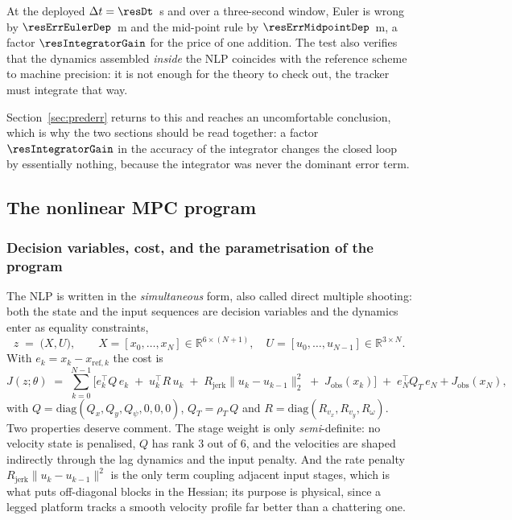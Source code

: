 \documentclass[11pt,a4paper]{article}
\newcommand{\R}{\mathbb{R}}
\newcommand{\Jobs}{J_{\mathrm{obs}}}
\newcommand{\Rjerk}{R_{\mathrm{jerk}}}
\begin{document}

At the deployed $\Delta t=\resDt$~s and over a three-second window, Euler is wrong by
$\resErrEulerDep$~m and the mid-point rule by $\resErrMidpointDep$~m, a factor $\resIntegratorGain$ for the
price of one addition. The test also verifies that the dynamics assembled \emph{inside} the NLP coincides
with the reference scheme to machine precision: it is not enough for the theory to check out, the tracker
must integrate that way.

Section~\ref{sec:prederr} returns to this and reaches an uncomfortable conclusion, which is why the two
sections should be read together: a factor $\resIntegratorGain$ in the accuracy of the integrator changes the
closed loop by essentially nothing, because the integrator was never the dominant error term.

\subsection{The nonlinear MPC program}
\label{sec:nlp}

\subsubsection{Decision variables, cost, and the parametrisation of the program}
\label{sec:shoot}

The NLP is written in the \emph{simultaneous} form, also called direct multiple shooting: both the state and
the input sequences are decision variables and the dynamics enter as equality constraints,
\begin{equation}
  z \;=\; \big(X,U\big),\qquad X=[x_0,\dots,x_N]\in\R^{6\times(N+1)},\quad U=[u_0,\dots,u_{N-1}]\in\R^{3\times N}.
\end{equation}
With $e_k=x_k-x_{\mathrm{ref},k}$ the cost is
\begin{equation}
  J(z;\theta) \;=\;
  \sum_{k=0}^{N-1}\Big[e_k^{\!\top} Q\, e_k
  \;+\; u_k^{\!\top} R\, u_k
  \;+\; \Rjerk\|u_k-u_{k-1}\|_2^2
  \;+\; \Jobs(x_k)\Big]
  \;+\;e_N^{\!\top} Q_T\, e_N + \Jobs(x_N),
  \label{eq:cost}
\end{equation}
with $Q=\mathrm{diag}(Q_x,Q_y,Q_\psi,0,0,0)$, $Q_T=\rho_T\,Q$ and $R=\mathrm{diag}(R_{v_x},R_{v_y},R_\omega)$.
Two properties deserve comment. The stage weight is only \emph{semi}-definite: no velocity state is
penalised, $Q$ has rank $3$ out of $6$, and the velocities are shaped indirectly through the lag dynamics and
the input penalty. And the rate penalty $\Rjerk\|u_k-u_{k-1}\|^2$ is the only term coupling adjacent input
stages, which is what puts off-diagonal blocks in the Hessian; its purpose is physical, since a legged
platform tracks a smooth velocity profile far better than a chattering one.
\end{document}
